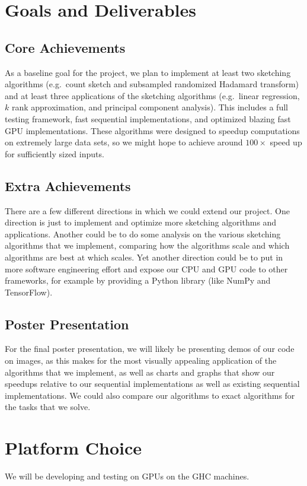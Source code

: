 \documentclass[12pt]{article}
\begin{document}
\section{Goals and Deliverables}
\subsection{Core Achievements}
As a baseline goal for the project, we plan to implement at least two sketching algorithms (e.g.\ count sketch and subsampled randomized Hadamard transform) and at least three applications of the sketching algorithms (e.g.\ linear regression, $k$ rank approximation, and principal component analysis). This includes a full testing framework, fast sequential implementations, and optimized blazing fast GPU implementations. These algorithms were designed to speedup computations on extremely large data sets, so we might hope to achieve around $100\times$ speed up for sufficiently sized inputs. 

\subsection{Extra Achievements}
There are a few different directions in which we could extend our project. One direction is just to implement and optimize more sketching algorithms and applications. Another could be to do some analysis on the various sketching algorithms that we implement, comparing how the algorithms scale and which algorithms are best at which scales. Yet another direction could be to put in more software engineering effort and expose our CPU and GPU code to other frameworks, for example by providing a Python library (like NumPy and TensorFlow). 

\subsection{Poster Presentation}
For the final poster presentation, we will likely be presenting demos of our code on images, as this makes for the most visually appealing application of the algorithms that we implement, as well as charts and graphs that show our speedups relative to our sequential implementations as well as existing sequential implementations. We could also compare our algorithms to exact algorithms for the tasks that we solve. 

\section{Platform Choice}
We will be developing and testing on GPUs on the GHC machines.
\end{document}
